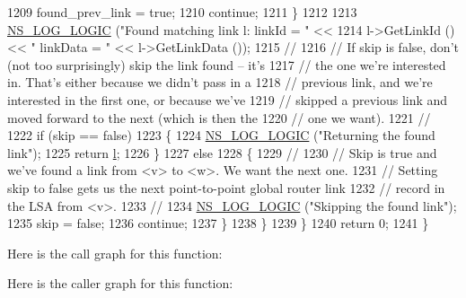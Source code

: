 \begin{DoxyCode}
1209               found\_prev\_link = \textcolor{keyword}{true};
1210               \textcolor{keywordflow}{continue};
1211             \}
1212 
1213           \hyperlink{group__logging_ga88acd260151caf2db9c0fc84997f45ce}{NS\_LOG\_LOGIC} (\textcolor{stringliteral}{"Found matching link l:  linkId = "} <<
1214                         l->GetLinkId () << \textcolor{stringliteral}{" linkData = "} << l->GetLinkData ());
1215 \textcolor{comment}{//}
1216 \textcolor{comment}{// If skip is false, don't (not too surprisingly) skip the link found -- it's }
1217 \textcolor{comment}{// the one we're interested in.  That's either because we didn't pass in a }
1218 \textcolor{comment}{// previous link, and we're interested in the first one, or because we've }
1219 \textcolor{comment}{// skipped a previous link and moved forward to the next (which is then the}
1220 \textcolor{comment}{// one we want).}
1221 \textcolor{comment}{//}
1222           \textcolor{keywordflow}{if} (skip == \textcolor{keyword}{false})
1223             \{
1224               \hyperlink{group__logging_ga88acd260151caf2db9c0fc84997f45ce}{NS\_LOG\_LOGIC} (\textcolor{stringliteral}{"Returning the found link"});
1225               \textcolor{keywordflow}{return} \hyperlink{buildings__pathloss_8m_a5b54c0a045f179bcbbbc9abcb8b5cd4c}{l};
1226             \}
1227           \textcolor{keywordflow}{else}
1228             \{
1229 \textcolor{comment}{//}
1230 \textcolor{comment}{// Skip is true and we've found a link from <v> to <w>.  We want the next one.}
1231 \textcolor{comment}{// Setting skip to false gets us the next point-to-point global router link}
1232 \textcolor{comment}{// record in the LSA from <v>.}
1233 \textcolor{comment}{//}
1234               \hyperlink{group__logging_ga88acd260151caf2db9c0fc84997f45ce}{NS\_LOG\_LOGIC} (\textcolor{stringliteral}{"Skipping the found link"});
1235               skip = \textcolor{keyword}{false};
1236               \textcolor{keywordflow}{continue};
1237             \}
1238         \}
1239     \}
1240   \textcolor{keywordflow}{return} 0;
1241 \}
\end{DoxyCode}


Here is the call graph for this function\+:




Here is the caller graph for this function\+:


